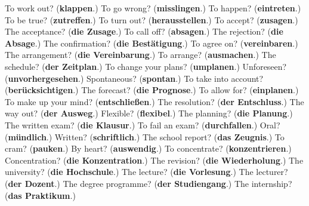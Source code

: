 \begin{tcolorbox}[breakable,colback=teal!4,colframe=teal!35!black,title={Before you move on}]
To work out? (\textbf{klappen}.) To go wrong? (\textbf{misslingen}.) To happen? (\textbf{eintreten}.) To be true? (\textbf{zutreffen}.) To turn out? (\textbf{herausstellen}.) To accept? (\textbf{zusagen}.) The acceptance? (\textbf{die Zusage}.) To call off? (\textbf{absagen}.) The rejection? (\textbf{die Absage}.) The confirmation? (\textbf{die Bestätigung}.) To agree on? (\textbf{vereinbaren}.) The arrangement? (\textbf{die Vereinbarung}.) To arrange? (\textbf{ausmachen}.) The schedule? (\textbf{der Zeitplan}.) To change your plans? (\textbf{umplanen}.) Unforeseen? (\textbf{unvorhergesehen}.) Spontaneous? (\textbf{spontan}.) To take into account? (\textbf{berücksichtigen}.) The forecast? (\textbf{die Prognose}.) To allow for? (\textbf{einplanen}.) To make up your mind? (\textbf{entschließen}.) The resolution? (\textbf{der Entschluss}.) The way out? (\textbf{der Ausweg}.) Flexible? (\textbf{flexibel}.) The planning? (\textbf{die Planung}.) The written exam? (\textbf{die Klausur}.) To fail an exam? (\textbf{durchfallen}.) Oral? (\textbf{mündlich}.) Written? (\textbf{schriftlich}.) The school report? (\textbf{das Zeugnis}.) To cram? (\textbf{pauken}.) By heart? (\textbf{auswendig}.) To concentrate? (\textbf{konzentrieren}.) Concentration? (\textbf{die Konzentration}.) The revision? (\textbf{die Wiederholung}.) The university? (\textbf{die Hochschule}.) The lecture? (\textbf{die Vorlesung}.) The lecturer? (\textbf{der Dozent}.) The degree programme? (\textbf{der Studiengang}.) The internship? (\textbf{das Praktikum}.)
\end{tcolorbox}

